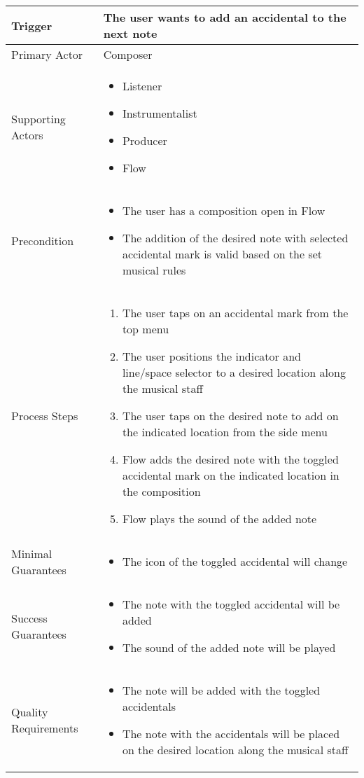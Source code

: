 \begin{tabularx}{\textwidth}{|X|X|}
\hline
Trigger & 
The user wants to add an accidental to the next note \\
\hline
Primary Actor & 
Composer \\
\hline
Supporting Actors & 
\begin{itemize}
\item Listener
\item Instrumentalist
\item Producer
\item Flow
\end{itemize} \\
\hline
Precondition & 
\begin{itemize}
\item The user has a composition open in Flow
\item The addition of the desired note with selected accidental mark is valid based on the set musical rules
\end{itemize} \\
\hline
Process Steps & 
\begin{enumerate}
\item The user taps on an accidental mark from the top menu
\item The user positions the indicator and line/space selector to a desired location along the musical staff
\item The user taps on the desired note to add on the indicated location from the side menu
\item Flow adds the desired note with the toggled accidental mark on the indicated location in the composition
\item Flow plays the sound of the added note
\end{enumerate} \\
\hline
Minimal Guarantees & 
\begin{itemize}
  \item The icon of the toggled accidental will change
\end{itemize} \\
\hline
Success Guarantees & 
\begin{itemize}
  \item The note with the toggled accidental will be added
  \item The sound of the added note will be played
\end{itemize} \\
\hline
Quality Requirements & 
\begin{itemize}
\item The note will be added with the toggled accidentals
\item The note with the accidentals will be placed on the desired location along the musical staff
\end{itemize} \\ 
\hline
\end{tabularx}

